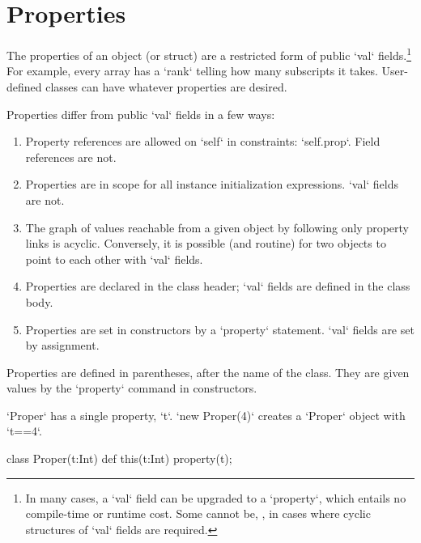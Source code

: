 \section{Properties}
\label{PropertiesInClasses}

The properties of an object (or struct) are a restricted form of public
\xcd`val` fields.\footnote{In many cases, a 
\xcd`val` field can be upgraded to a \xcd`property`, which 
entails no compile-time or runtime cost.  Some cannot be, \eg, in cases where
cyclic structures of \xcd`val` fields are required.} 
For example,  every array has a \xcd`rank` telling
how many subscripts it takes.  User-defined classes can have whatever
properties are desired. 

Properties differ from public \xcd`val` fields in a few ways: 
\begin{enumerate}
\item Property references are allowed on \xcd`self` in constraints:
      \xcd`self.prop`.  Field references are not.
\item Properties are in scope for all instance initialization expressions.
      \xcd`val` fields are not.
\item The graph of values reachable from a given object by following only
      property links is acyclic.  Conversely, it is possible (and routine) for
      two objects to point to each other with \xcd`val` fields.
\item Properties are declared in the class header; \xcd`val` fields are
      defined in the class body.
\item Properties are set in constructors by a \xcd`property` statement.
      \xcd`val` fields are set by assignment.
\end{enumerate}



Properties are defined in parentheses, after the name of the class.  They are
given values by the \xcd`property` command in constructors.

\begin{ex}
\xcd`Proper` has a single property, \xcd`t`.  \xcd`new Proper(4)` creates a
\xcd`Proper` object with \xcd`t==4`. 
\begin{xten}
class Proper(t:Int) {
  def this(t:Int) {property(t);}
}
\end{xten}

\end{ex}


